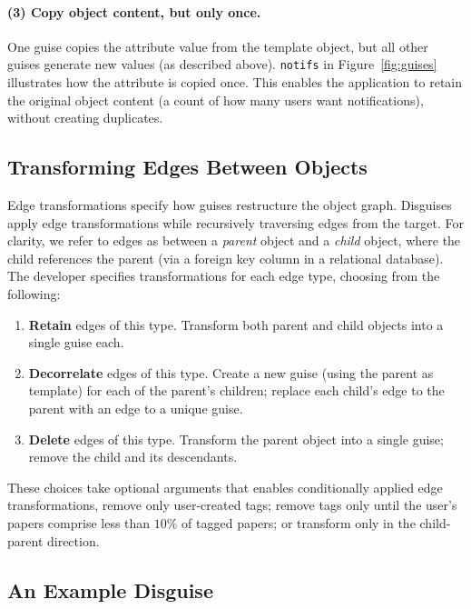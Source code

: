 \paragraph{(3) Copy object content, but only once.} 
One guise copies the attribute value from the template object, but all other guises generate new
values (as described above). \texttt{notifs} in Figure~\ref{fig:guises} illustrates how the
attribute is copied once. This enables the application to retain the original object content
(\eg a count of how many users want notifications), without \eg creating duplicates.

\subsection{Transforming Edges Between Objects}
\label{design:edgepol}

Edge transformations specify how guises restructure the object graph.  Disguises apply edge
transformations while recursively traversing edges from the target.  For clarity, we refer to edges
as between a \emph{parent} object and a \emph{child} object, where the child references the parent
(\eg via a foreign key column in a relational database).
%
The developer specifies transformations for each edge type, choosing from the following:
\begin{enumerate}[nosep]
    \item \textbf{Retain} edges of this type. Transform both parent and child objects into a single guise
        each.
    \item \textbf{Decorrelate} edges of this type. Create a new guise (using the parent as template) for each of
        the parent's children; replace each child's edge to the parent with an edge to a unique
        guise.
    \item \textbf{Delete} edges of this type. Transform the parent object into a single guise;
        remove the child and its descendants.
\end{enumerate}
These choices take optional arguments that enables conditionally applied edge transformations, \eg remove only
user-created tags; remove tags only until the user's papers comprise less than $10$\% of tagged papers;
or transform only in the child-parent direction.

\subsection{An Example Disguise}
\label{design:eg}

